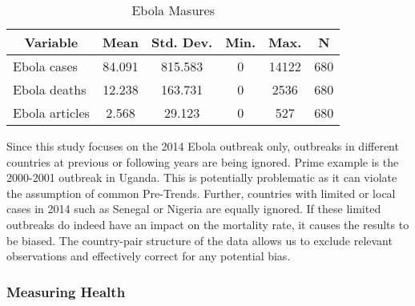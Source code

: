\documentclass{article}
\begin{document}
\begin{table}[htbp]\centering \caption{Ebola Masures \label{Ebola Measures}}
\begin{tabular}{l c c c c c}\hline\hline
\multicolumn{1}{c}{\textbf{Variable}} & \textbf{Mean}
 & \textbf{Std. Dev.}& \textbf{Min.} &  \textbf{Max.} & \textbf{N}\\ \hline
Ebola cases & 84.091 & 815.583 & 0 & 14122 & 680 \\
Ebola deaths & 12.238 & 163.731 & 0 & 2536 & 680 \\
Ebola articles & 2.568 & 29.123 & 0 & 527 & 680 \\
\hline\end{tabular}
\end{table}

Since this study focuses on the 2014 Ebola outbreak only, outbreaks in different countries at previous or following years are being ignored. Prime example is the 2000-2001 outbreak in Uganda. This is potentially problematic as it can violate the assumption of common Pre-Trends. Further, countries with limited or local cases in 2014 such as Senegal or Nigeria are equally ignored. If these limited outbreaks do indeed have an impact on the mortality rate, it causes the results to be biased. The country-pair structure of the data allows us to exclude relevant observations and effectively correct for any potential bias.

\subsubsection{Measuring Health}
\end{document}
